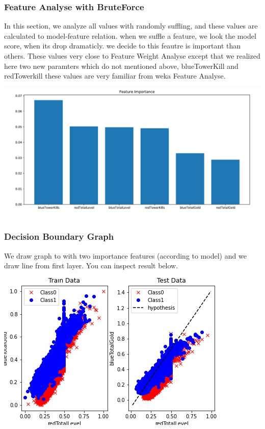 \documentclass[a4paper]{article}
\begin{document}
\pagebreak
\subsubsection{Feature Analyse with BruteForce}

In this section, we analyze all values with randomly suffling, and these values are calculated to model-feature relation. when we suffle a feature, we look the model score, when its drop dramaticly. we decide to this feautre is important than others. These values very close to Feature Weight Analyse except that we realized here two new paramters which do not mentioned above, blueTowerKill and redTowerkill these values are very familiar from weka Feature Analyse.

\includegraphics[width=.9\linewidth]{graphs/logisticregression_feature_importance.pdf}

\subsubsection{Decision Boundary Graph}

We draw graph to with two importance features (according to model) and we draw line from first layer. You can inspect result below.

\medskip

\includegraphics[width=.9\linewidth]{graphs/logisticregression_decision_boundary.jpeg}
\end{document}
